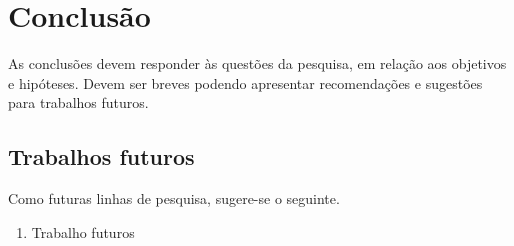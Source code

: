 \chapter{Conclusão} \label{cha:conclusion}

As conclusões devem responder às questões da pesquisa, em relação aos objetivos e hipóteses. Devem ser breves podendo apresentar recomendações e sugestões para trabalhos futuros.


\section*{Trabalhos futuros}

Como futuras linhas de pesquisa, sugere-se o seguinte.

\begin{enumerate}
  \item Trabalho futuros
\end{enumerate}
